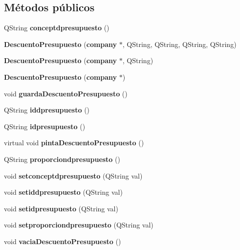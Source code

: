 \subsection*{M\'{e}todos p\'{u}blicos}
\begin{CompactItemize}
\item 
QString {\bf conceptdpresupuesto} ()\label{classDescuentoPresupuesto_a0}

\item 
{\bf Descuento\-Presupuesto} ({\bf company} $\ast$, QString, QString, QString, QString)
\item 
{\bf Descuento\-Presupuesto} ({\bf company} $\ast$, QString)\label{classDescuentoPresupuesto_a2}

\item 
{\bf Descuento\-Presupuesto} ({\bf company} $\ast$)\label{classDescuentoPresupuesto_a3}

\item 
void {\bf guarda\-Descuento\-Presupuesto} ()\label{classDescuentoPresupuesto_a4}

\item 
QString {\bf iddpresupuesto} ()\label{classDescuentoPresupuesto_a5}

\item 
QString {\bf idpresupuesto} ()\label{classDescuentoPresupuesto_a6}

\item 
virtual void {\bf pinta\-Descuento\-Presupuesto} ()\label{classDescuentoPresupuesto_a7}

\item 
QString {\bf proporciondpresupuesto} ()\label{classDescuentoPresupuesto_a8}

\item 
void {\bf setconceptdpresupuesto} (QString val)\label{classDescuentoPresupuesto_a9}

\item 
void {\bf setiddpresupuesto} (QString val)\label{classDescuentoPresupuesto_a10}

\item 
void {\bf setidpresupuesto} (QString val)\label{classDescuentoPresupuesto_a11}

\item 
void {\bf setproporciondpresupuesto} (QString val)\label{classDescuentoPresupuesto_a12}

\item 
void {\bf vacia\-Descuento\-Presupuesto} ()\label{classDescuentoPresupuesto_a13}

\end{CompactItemize}


